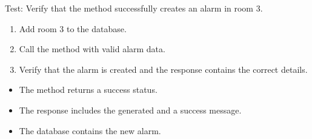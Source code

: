 \documentclass[letterpaper,10pt,english]{sphinxmanual}
\begin{document}
\begin{fulllineitems}
\label{\detokenize{test:test.test_alarm.test_create_alarm_level_success}}
\pysigstartsignatures
\pysiglinewithargsret
{}
{}
{}
\pysigstopsignatures
\sphinxAtStartPar
Test: Verify that the method successfully creates an alarm in room 3.
\begin{description}
\begin{enumerate}
%
\item {} 
\sphinxAtStartPar
Add room 3 to the database.

\item {} 
\sphinxAtStartPar
Call the  method with valid alarm data.

\item {} 
\sphinxAtStartPar
Verify that the alarm is created and the response contains the correct details.

\end{enumerate}

\begin{itemize}
\item {} 
\sphinxAtStartPar
The method returns a success status.

\item {} 
\sphinxAtStartPar
The response includes the generated  and a success message.

\item {} 
\sphinxAtStartPar
The database contains the new alarm.

\end{itemize}

\end{description}

\end{fulllineitems}

\end{document}
